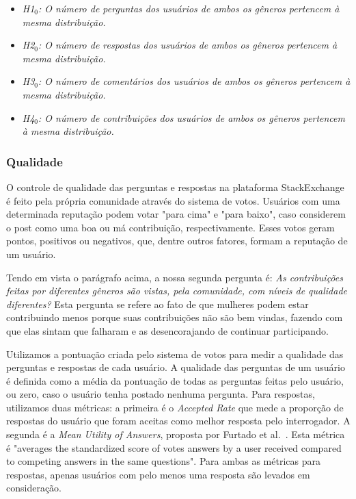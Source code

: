 \begin{itemize}
    \item \textit{H1$_0$: O número de perguntas dos usuários de ambos os gêneros pertencem à mesma distribuição.}
    \item \textit{H2$_0$: O número de respostas dos usuários de ambos os gêneros pertencem à mesma distribuição.}
    \item \textit{H3$_0$: O número de comentários dos usuários de ambos os gêneros pertencem à mesma distribuição.}
    \item \textit{H4$_0$: O número de contribuições dos usuários de ambos os gêneros pertencem à mesma distribuição.}
\end{itemize}

\subsubsection{Qualidade}

O controle de qualidade das perguntas e respostas na plataforma StackExchange é feito pela própria comunidade através do sistema de votos. Usuários com uma determinada reputação podem votar "para cima" e "para baixo", caso considerem o post como uma boa ou má contribuição, respectivamente. Esses votos geram pontos, positivos ou negativos, que, dentre outros fatores, formam a reputação de um usuário. 

Tendo em vista o parágrafo acima, a nossa segunda pergunta é: \textit{As contribuições feitas por diferentes gêneros são vistas, pela comunidade, com níveis de qualidade diferentes?} Esta pergunta se refere ao fato de que mulheres podem estar contribuindo menos porque suas contribuições não são bem vindas, fazendo com que elas sintam que falharam e as desencorajando de continuar participando. 

Utilizamos a pontuação criada pelo sistema de votos para medir a qualidade das perguntas e respostas de cada usuário. A qualidade das perguntas de um usuário é definida como a média da pontuação de todas as perguntas feitas pelo usuário, ou zero, caso o usuário tenha postado nenhuma pergunta. Para respostas, utilizamos duas métricas: a primeira é o \emph{Accepted Rate} que mede a proporção de respostas do usuário que foram aceitas como melhor resposta pelo interrogador. A segunda é a \emph{Mean Utility of Answers}, proposta por Furtado et al.~\cite{furtado2013contributor}. Esta métrica é "averages the standardized score of votes answers by a user received compared to competing answers in the same questions". Para ambas as métricas para respostas, apenas usuários com pelo menos uma resposta são levados em consideração.

